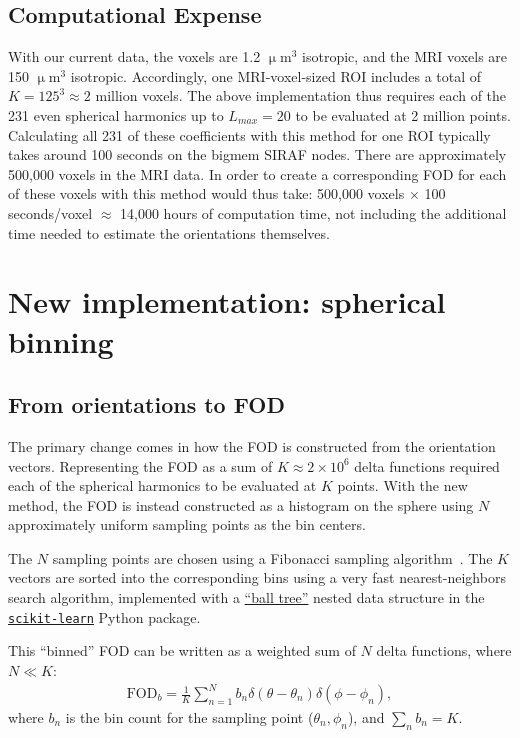 \documentclass{article}
\begin{document}
\subsection{Computational Expense}
With our current data, the \uct voxels are 1.2 $\upmu$m$^3$ isotropic, and the
MRI voxels are 150 $\upmu$m$^3$ isotropic. Accordingly, one MRI-voxel-sized ROI
includes a total of $K=125^3\approx 2$ million \uct voxels. The above
implementation thus requires each of the 231 even spherical harmonics up to
$L_{max}=20$ to be evaluated at 2 million points. Calculating all 231 of these
coefficients with this method for one ROI typically takes around 100 seconds on
the bigmem SIRAF nodes. There are approximately 500,000 voxels in the MRI data.
In order to create a corresponding \uct FOD for each of these voxels with this
method would thus take: 500,000 voxels $\times$ 100 seconds/voxel $\approx$
14,000 hours of computation time, not including the additional time needed
to estimate the orientations themselves.

\section{New implementation: spherical binning}
\subsection{From orientations to FOD}
The primary change comes in how the FOD is constructed from the orientation
vectors. Representing the FOD as a sum of $K\approx 2 \times 10^6$ delta
functions required each of the spherical harmonics to be evaluated at $K$
points. With the new method, the FOD is instead constructed as a histogram on
the sphere using $N$ approximately uniform sampling points as the bin centers.

The $N$ sampling points are chosen using a Fibonacci sampling
algorithm~\cite{Hannay2004}. The $K$ vectors are sorted into the corresponding
bins using a very fast nearest-neighbors search algorithm, implemented with a
\href{https://en.wikipedia.org/wiki/Ball_tree}{``ball tree''} nested data
structure in the
\href{http://scikit-learn.org/stable/modules/generated/sklearn.neighbors.NearestNeighbors.html#sklearn.neighbors.NearestNeighbors}{\texttt{scikit-learn}}
Python package.

This ``binned'' FOD can be written as a weighted sum of $N$ delta functions,
where $N \ll K$:
\begin{align}
  \label{eq:3}
  \text{FOD}_b = \frac{1}{K}\sum_{n=1}^N b_n \delta(\theta - \theta_n)\delta(\phi - \phi_n),
\end{align}
where $b_n$ is the bin count for the sampling point ($\theta_n, \phi_n$), and
$\sum_n b_n = K$.
\end{document}
